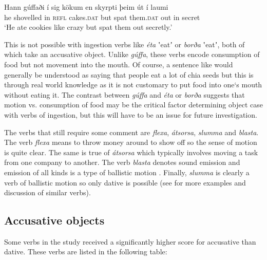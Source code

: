 \documentclass[output=paper,modfonts,nonflat,colorlinks,citecolor=brown]{langsci/langscibook}
\begin{document}
 
\ea%
    \label{ex:jonsson:4}
\gll     Hann   gúffaði   í   sig   kökum   en   skyrpti   þeim   út   í    laumi\\
  he   shovelled   in   \textsc{refl}   cakes.\textsc{dat}   but   spat   them\textsc{.dat}   out   in   secret\\
\glt `He ate cookies like crazy but spat them out secretly.'
\z

This is not possible with ingestion verbs like \textit{éta} ʽeatʼ or \textit{borða} ʽeatʼ, both of which take an accusative object. Unlike \textit{gúffa}, these verbs encode consumption of food but not movement into the mouth. Of course, a sentence like  would generally be understood as saying that people eat a lot of chia seeds but this is through real world knowledge as it is not customary to put food into one‘s mouth without eating it. The contrast between \textit{gúffa} and \textit{éta} or \textit{borða} suggests that motion vs. consumption of food may be the critical factor determining object case with verbs of ingestion, but this will have to be an issue for future investigation.

The verbs that still require some comment are \textit{flexa}, \textit{átsorsa}, \textit{slumma} and \textit{blasta}. The verb \textit{flexa} means to throw money around to show off so the sense of motion is quite clear. The same is true of \textit{átsorsa} which typically involves moving a task from one company to another. The verb \textit{blasta} denotes sound emission and emission of all kinds is a type of ballistic motion \citep{Jónsson2013a}. Finally, \textit{slumma} is clearly a verb of ballistic motion so only dative is possible (see \citealt{Jónsson2013a} for more examples and discussion of similar verbs).

\subsection{Accusative objects} %

Some verbs in the study received a significantly higher score for accusative than dative. These verbs are listed in the following table:  
\end{document}
